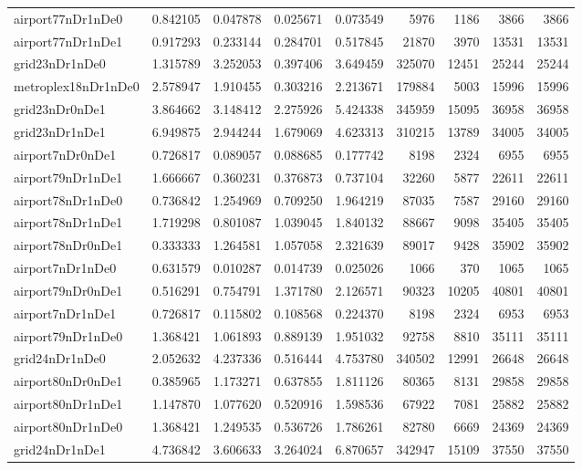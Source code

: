 \begin{longtable}{|l|r|r|r|r|r|r|r|r|}
airport77nDr1nDe0 & 0.842105 & 0.047878 & 0.025671 & 0.073549 & 5976 & 1186 & 3866 & 3866 \\
airport77nDr1nDe1 & 0.917293 & 0.233144 & 0.284701 & 0.517845 & 21870 & 3970 & 13531 & 13531 \\
grid23nDr1nDe0 & 1.315789 & 3.252053 & 0.397406 & 3.649459 & 325070 & 12451 & 25244 & 25244 \\
metroplex18nDr1nDe0 & 2.578947 & 1.910455 & 0.303216 & 2.213671 & 179884 & 5003 & 15996 & 15996 \\
grid23nDr0nDe1 & 3.864662 & 3.148412 & 2.275926 & 5.424338 & 345959 & 15095 & 36958 & 36958 \\
grid23nDr1nDe1 & 6.949875 & 2.944244 & 1.679069 & 4.623313 & 310215 & 13789 & 34005 & 34005 \\
airport7nDr0nDe1 & 0.726817 & 0.089057 & 0.088685 & 0.177742 & 8198 & 2324 & 6955 & 6955 \\
airport79nDr1nDe1 & 1.666667 & 0.360231 & 0.376873 & 0.737104 & 32260 & 5877 & 22611 & 22611 \\
airport78nDr1nDe0 & 0.736842 & 1.254969 & 0.709250 & 1.964219 & 87035 & 7587 & 29160 & 29160 \\
airport78nDr1nDe1 & 1.719298 & 0.801087 & 1.039045 & 1.840132 & 88667 & 9098 & 35405 & 35405 \\
airport78nDr0nDe1 & 0.333333 & 1.264581 & 1.057058 & 2.321639 & 89017 & 9428 & 35902 & 35902 \\
airport7nDr1nDe0 & 0.631579 & 0.010287 & 0.014739 & 0.025026 & 1066 & 370 & 1065 & 1065 \\
airport79nDr0nDe1 & 0.516291 & 0.754791 & 1.371780 & 2.126571 & 90323 & 10205 & 40801 & 40801 \\
airport7nDr1nDe1 & 0.726817 & 0.115802 & 0.108568 & 0.224370 & 8198 & 2324 & 6953 & 6953 \\
airport79nDr1nDe0 & 1.368421 & 1.061893 & 0.889139 & 1.951032 & 92758 & 8810 & 35111 & 35111 \\
grid24nDr1nDe0 & 2.052632 & 4.237336 & 0.516444 & 4.753780 & 340502 & 12991 & 26648 & 26648 \\
airport80nDr0nDe1 & 0.385965 & 1.173271 & 0.637855 & 1.811126 & 80365 & 8131 & 29858 & 29858 \\
airport80nDr1nDe1 & 1.147870 & 1.077620 & 0.520916 & 1.598536 & 67922 & 7081 & 25882 & 25882 \\
airport80nDr1nDe0 & 1.368421 & 1.249535 & 0.536726 & 1.786261 & 82780 & 6669 & 24369 & 24369 \\
grid24nDr1nDe1 & 4.736842 & 3.606633 & 3.264024 & 6.870657 & 342947 & 15109 & 37550 & 37550 \\

\end{longtable}
